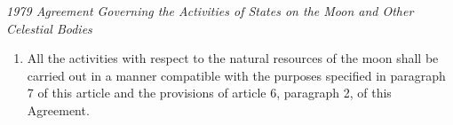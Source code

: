 \begin{conventiondetails}{\textit{1979 Agreement Governing the Activities of States on the Moon and Other Celestial Bodies}}
\begin{enumerate}
        \begin{enumerate}[label=(\alph*)]
            \item The orderly and safe development of the natural resources of the moon;
            \item The rational management of those resources;
            \item The expansion of opportunities in the use of those resources;
            \item An equitable sharing by all States Parties in the benefits derived from those resources, whereby the interests and needs of the developing countries, as well as the efforts of those countries which have contributed either directly or indirectly to the exploration of the moon, shall be given special consideration.
        \end{enumerate}
        \item All the activities with respect to the natural resources of the moon shall be carried out in a manner compatible with the purposes specified in paragraph 7 of this article and the provisions of article 6, paragraph 2, of this Agreement.
    \end{enumerate}
\end{conventiondetails}